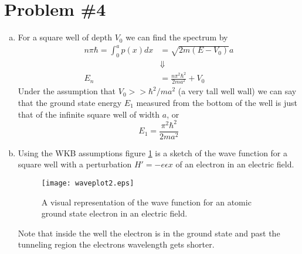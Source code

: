 \documentclass[11pt]{article}
\numberwithin{equation}{section}
\begin{document}
\section{Problem \#4}
\begin{enumerate}[(a)]
\item
For a square well of depth $V_0$ we can find the spectrum by
\begin{align*}
n\pi\hbar = \int_0^ap(x)dx &= \sqrt{2m(E-V_0)}a\\
&\Downarrow\\
E_n &= \frac{n\pi^2\hbar^2}{2ma^2} + V_0
\end{align*}
Under the assumption that $V_0 >> \hbar^2/ma^2$ (a very tall well wall) we can say that the ground state energy $E_1$ measured from the bottom of the well is just that of the infinite square well of width $a$, or
$$E_1 = \frac{\pi^2\hbar^2}{2ma^2}$$

\item
Using the WKB assumptions figure \ref{wavePlot2} is a sketch of the wave function for a square well with a perturbation $H' = -e\epsilon x$ of an electron in an electric field.
\begin{figure}
\centering
\texttt{[image: waveplot2.eps]}
\caption{A visual representation of the wave function for an atomic ground state electron in an electric field.}
\label{wavePlot2}
\end{figure}
Note that inside the well the electron is in the ground state and past the tunneling region the electrons wavelength gets shorter.


\end{enumerate}
\end{document}

